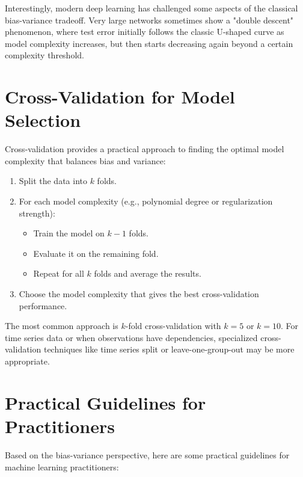 \documentclass{article}
\begin{document}
Interestingly, modern deep learning has challenged some aspects of the classical bias-variance tradeoff. Very large networks sometimes show a "double descent" phenomenon, where test error initially follows the classic U-shaped curve as model complexity increases, but then starts decreasing again beyond a certain complexity threshold.

\section{Cross-Validation for Model Selection}

Cross-validation provides a practical approach to finding the optimal model complexity that balances bias and variance:

\begin{enumerate}
\item Split the data into $k$ folds.
\item For each model complexity (e.g., polynomial degree or regularization strength):
  \begin{itemize}
  \item Train the model on $k-1$ folds.
  \item Evaluate it on the remaining fold.
  \item Repeat for all $k$ folds and average the results.
  \end{itemize}
\item Choose the model complexity that gives the best cross-validation performance.
\end{enumerate}

The most common approach is $k$-fold cross-validation with $k=5$ or $k=10$. For time series data or when observations have dependencies, specialized cross-validation techniques like time series split or leave-one-group-out may be more appropriate.

\section{Practical Guidelines for Practitioners}

Based on the bias-variance perspective, here are some practical guidelines for machine learning practitioners:
\end{document}
